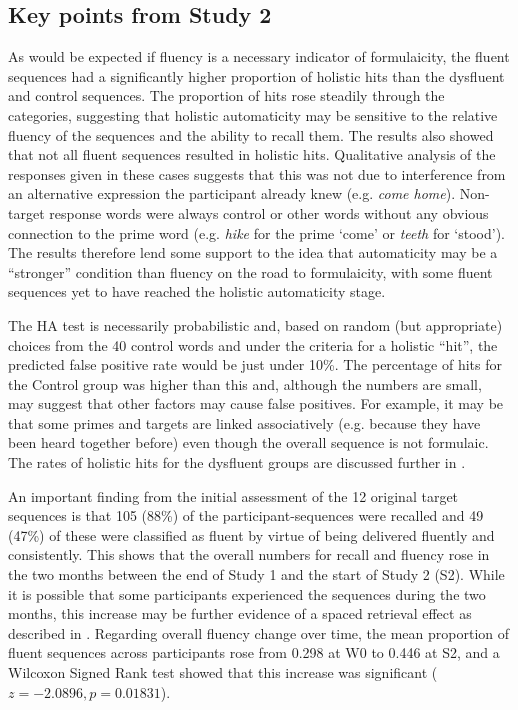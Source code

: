 \documentclass[output=paper]{langscibook}
\begin{document}
\subsection{Key points from Study 2}\label{sec:cutler:3.5}

As would be expected if fluency is a necessary indicator of formulaicity, the fluent sequences had a significantly higher proportion of holistic hits than the dysfluent and control sequences. The proportion of hits rose steadily through the categories, suggesting that holistic automaticity may be sensitive to the relative fluency of the sequences and the ability to recall them. The results also showed that not all fluent sequences resulted in holistic hits. Qualitative analysis of the responses given in these cases suggests that this was not due to interference from an alternative expression the participant already knew (e.g. \textit{come home}). Non-target response words were always control or other words without any obvious connection to the prime word (e.g. \textit{hike} for the prime ‘come’ or \textit{teeth} for ‘stood’). The results therefore lend some support to the idea that automaticity may be a ``stronger'' condition than fluency on the road to formulaicity, with some fluent sequences yet to have reached the holistic automaticity stage. 

The HA test is necessarily probabilistic and, based on random (but appropriate) choices from the 40 control words and under the criteria for a holistic ``hit'', the predicted false positive rate would be just under 10\%. The percentage of hits for the Control group was higher than this and, although the numbers are small, may suggest that other factors may cause false positives. For example, it may be that some primes and targets are linked associatively (e.g. because they have been heard together before) even though the overall sequence is not formulaic. The rates of holistic hits for the dysfluent groups are discussed further in .

An important finding from the initial assessment of the 12 original target sequences is that 105 (88\%) of the participant-sequences were recalled and 49 (47\%) of these were classified as fluent by virtue of being delivered fluently and consistently. This shows that the overall numbers for recall and fluency rose in the two months between the end of Study 1 and the start of Study 2 (S2). While it is possible that some participants experienced the sequences during the two months, this increase may be further evidence of a spaced retrieval effect as described in . Regarding overall fluency change over time, the mean proportion of fluent sequences across participants rose from 0.298 at W0 to 0.446 at S2, and a Wilcoxon Signed Rank test showed that this increase was significant ($z=-2.0896, p= 0.01831$).
\end{document}
